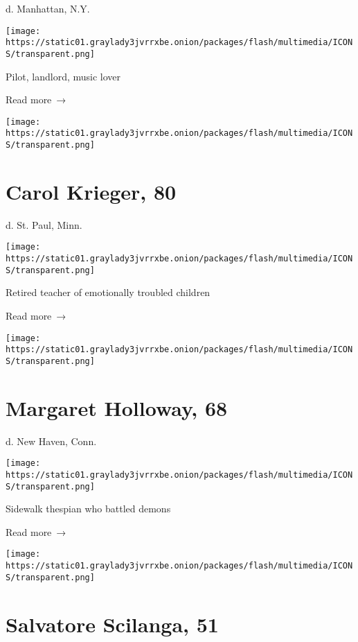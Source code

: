 d. Manhattan, N.Y.

\texttt{[image: https://static01.graylady3jvrrxbe.onion/packages/flash/multimedia/ICONS/transparent.png]}

Pilot, landlord, music lover

 Read more~→

\href{https://www.nytimes3xbfgragh.onion/2020/06/12/obituaries/carol-krieger-dead-coronavirus.html}{}

\texttt{[image: https://static01.graylady3jvrrxbe.onion/packages/flash/multimedia/ICONS/transparent.png]}

\hypertarget{carol-krieger-80}{%
\section{Carol Krieger, 80}\label{carol-krieger-80}}

d. St. Paul, Minn.

\texttt{[image: https://static01.graylady3jvrrxbe.onion/packages/flash/multimedia/ICONS/transparent.png]}

Retired teacher of emotionally troubled children

 Read more~→

\href{https://www.nytimes3xbfgragh.onion/2020/06/11/nyregion/margaret-holloway-the-shakespeare-lady-of-new-haven-dies-at-68.html}{}

\texttt{[image: https://static01.graylady3jvrrxbe.onion/packages/flash/multimedia/ICONS/transparent.png]}

\hypertarget{margaret-holloway-68}{%
\section{Margaret Holloway, 68}\label{margaret-holloway-68}}

d. New Haven, Conn.

\texttt{[image: https://static01.graylady3jvrrxbe.onion/packages/flash/multimedia/ICONS/transparent.png]}

Sidewalk thespian who battled demons

 Read more~→

\href{https://www.nytimes3xbfgragh.onion/2020/06/11/obituaries/salvatore-scilanga-dead-coronavirus.html}{}

\texttt{[image: https://static01.graylady3jvrrxbe.onion/packages/flash/multimedia/ICONS/transparent.png]}

\hypertarget{salvatore-scilanga-51}{%
\section{Salvatore Scilanga, 51}\label{salvatore-scilanga-51}}

